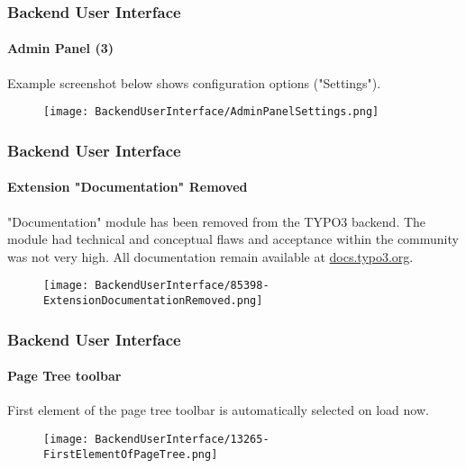 
\begin{frame}[fragile]
	\frametitle{Backend User Interface}
	\framesubtitle{Admin Panel (3)}

	Example screenshot below shows configuration options ("Settings").

	\begin{figure}
		\texttt{[image: BackendUserInterface/AdminPanelSettings.png]}
	\end{figure}

\end{frame}


\begin{frame}[fragile]
	\frametitle{Backend User Interface}
	\framesubtitle{Extension "Documentation" Removed}

	"Documentation" module has been removed from the TYPO3 backend.
    The module had technical and conceptual flaws and acceptance within the
    community was not very high.
    \newline
    All documentation remain available at \href{https://docs.typo3.org}{docs.typo3.org}.

	\begin{figure}
		\texttt{[image: BackendUserInterface/85398-ExtensionDocumentationRemoved.png]}
	\end{figure}

\end{frame}


\begin{frame}[fragile]
	\frametitle{Backend User Interface}
	\framesubtitle{Page Tree toolbar}

	First element of the page tree toolbar is automatically selected on load now.

	\begin{figure}
		\texttt{[image: BackendUserInterface/13265-FirstElementOfPageTree.png]}
	\end{figure}

\end{frame}

